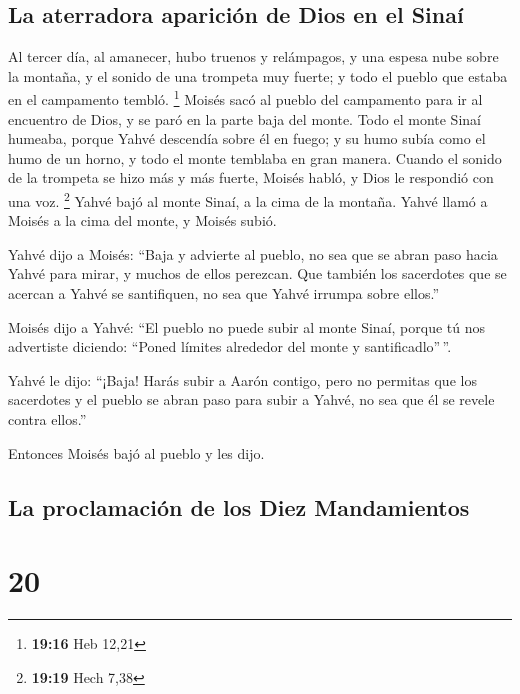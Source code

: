 \hypertarget{la-aterradora-apariciuxf3n-de-dios-en-el-sinauxed}{%
\subsection{La aterradora aparición de Dios en el
Sinaí}\label{la-aterradora-apariciuxf3n-de-dios-en-el-sinauxed}}

 Al tercer día, al amanecer, hubo truenos y relámpagos, y
una espesa nube sobre la montaña, y el sonido de una trompeta muy
fuerte; y todo el pueblo que estaba en el campamento tembló. \footnote{\textbf{19:16}
  Heb 12,21}  Moisés sacó al pueblo del campamento para
ir al encuentro de Dios, y se paró en la parte baja del monte.
 Todo el monte Sinaí humeaba, porque Yahvé descendía
sobre él en fuego; y su humo subía como el humo de un horno, y todo el
monte temblaba en gran manera.  Cuando el sonido de la
trompeta se hizo más y más fuerte, Moisés habló, y Dios le respondió con
una voz. \footnote{\textbf{19:19} Hech 7,38}  Yahvé bajó
al monte Sinaí, a la cima de la montaña. Yahvé llamó a Moisés a la cima
del monte, y Moisés subió.

 Yahvé dijo a Moisés: ``Baja y advierte al pueblo, no sea
que se abran paso hacia Yahvé para mirar, y muchos de ellos perezcan.
 Que también los sacerdotes que se acercan a Yahvé se
santifiquen, no sea que Yahvé irrumpa sobre ellos.''

 Moisés dijo a Yahvé: ``El pueblo no puede subir al monte
Sinaí, porque tú nos advertiste diciendo: ``Poned límites alrededor del
monte y santificadlo''\,''.

 Yahvé le dijo: ``¡Baja! Harás subir a Aarón contigo,
pero no permitas que los sacerdotes y el pueblo se abran paso para subir
a Yahvé, no sea que él se revele contra ellos.''

 Entonces Moisés bajó al pueblo y les dijo.

\hypertarget{la-proclamaciuxf3n-de-los-diez-mandamientos}{%
\subsection{La proclamación de los Diez
Mandamientos}\label{la-proclamaciuxf3n-de-los-diez-mandamientos}}

\hypertarget{section-19}{%
\section{20}\label{section-19}}

